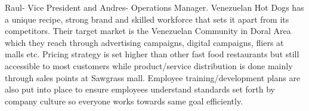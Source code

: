  
Raul- Vice President and Andres- Operations Manager. Venezuelan Hot Dogs has a unique recipe, strong brand and skilled workforce that sets it apart from its competitors. Their target market is the Venezuelan Community in Doral Area which they reach through advertising campaigns, digital campaigns, fliers at malls etc. Pricing strategy is set higher than other fast food restaurants but still accessible to most customers while product/service distribution is done mainly through sales points at Sawgrass mall. Employee training/development plans are also put into place to ensure employees understand standards set forth by company culture so everyone works towards same goal efficiently.